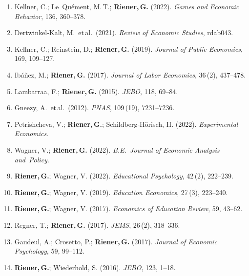 \documentclass[10pt,A4]{article}
\providecommand{\tightlist}{\setlength{\itemsep}{0pt}\setlength{\parskip}{0pt}}
\begin{document}
\begin{enumerate}
\def\labelenumi{\arabic{enumi}.}
\tightlist
\item
  Kellner, C.; Le~Quément, M.\,T.; \textbf{Riener,\,G.} (2022).
  \emph{Games and Economic Behavior}, 136, 360--378.\\
\item
  Dertwinkel‑Kalt, M.~et\,al.~(2021). \emph{Review of Economic Studies},
  rdab043.\\
\item
  Kellner, C.; Reinstein, D.; \textbf{Riener,\,G.} (2019). \emph{Journal
  of Public Economics}, 169, 109--127.\\
\item
  Ibáñez, M.; \textbf{Riener,\,G.} (2017). \emph{Journal of Labor
  Economics}, 36\,(2), 437--478.\\
\item
  Lambarraa, F.; \textbf{Riener,\,G.} (2015). \emph{JEBO}, 118,
  69--84.\\
\item
  Gneezy, A.~et\,al.~(2012). \emph{PNAS}, 109\,(19), 7231--7236.\\
\item
  Petrishcheva, V.; \textbf{Riener,\,G.}; Schildberg‑Hörisch, H. (2022).
  \emph{Experimental Economics}.\\
\item
  Wagner, V.; \textbf{Riener,\,G.} (2022). \emph{B.E.~Journal of
  Economic Analysis and~Policy}.\\
\item
  \textbf{Riener,\,G.}; Wagner, V. (2022). \emph{Educational
  Psychology}, 42\,(2), 222--239.\\
\item
  \textbf{Riener,\,G.}; Wagner, V. (2019). \emph{Education Economics},
  27\,(3), 223--240.\\
\item
  \textbf{Riener,\,G.}; Wagner, V. (2017). \emph{Economics of Education
  Review}, 59, 43--62.\\
\item
  Regner, T.; \textbf{Riener,\,G.} (2017). \emph{JEMS}, 26\,(2),
  318--336.\\
\item
  Gaudeul, A.; Crosetto, P.; \textbf{Riener,\,G.} (2017). \emph{Journal
  of Economic Psychology}, 59, 99--112.\\
\item
  \textbf{Riener,\,G.}; Wiederhold, S. (2016). \emph{JEBO}, 123,
  1--18.\\

\end{enumerate}
\end{document}

